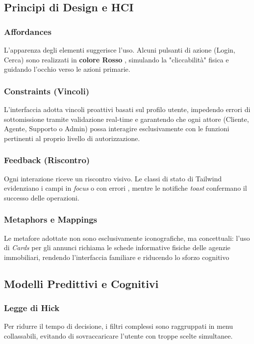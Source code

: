\documentclass[a4paper,11pt]{article}
\begin{document}
\subsection{Principi di Design e HCI}

\subsubsection{Affordances}
L'apparenza degli elementi suggerisce l'uso. Alcuni pulsanti di azione (Login, Cerca) sono realizzati in \textbf{colore Rosso} , simulando la "cliccabilità" fisica e guidando l'occhio verso le azioni primarie.

\subsubsection{Constraints (Vincoli)}
L’interfaccia adotta vincoli proattivi basati sul profilo utente, impedendo errori di sottomissione tramite validazione real-time e garantendo che ogni attore (Cliente, Agente, Supporto o Admin) possa interagire esclusivamente con le funzioni pertinenti al proprio livello di autorizzazione.

\subsubsection{Feedback (Riscontro)}
Ogni interazione riceve un riscontro visivo. Le classi di stato di Tailwind evidenziano i campi in \textit{focus} o con errori , mentre le notifiche \textit{toast} confermano il successo delle operazioni.

\subsubsection{Metaphors e Mappings}
Le metafore adottate non sono esclusivamente iconografiche, ma concettuali: l'uso di \textit{Cards} per gli annunci richiama le schede informative fisiche delle agenzie immobiliari, rendendo l'interfaccia familiare e riducendo lo sforzo cognitivo

\subsection{Modelli Predittivi e Cognitivi}

\subsubsection{Legge di Hick}
Per ridurre il tempo di decisione, i filtri complessi sono raggruppati in menu collassabili, evitando di sovraccaricare l'utente con troppe scelte simultanee.
\end{document}
